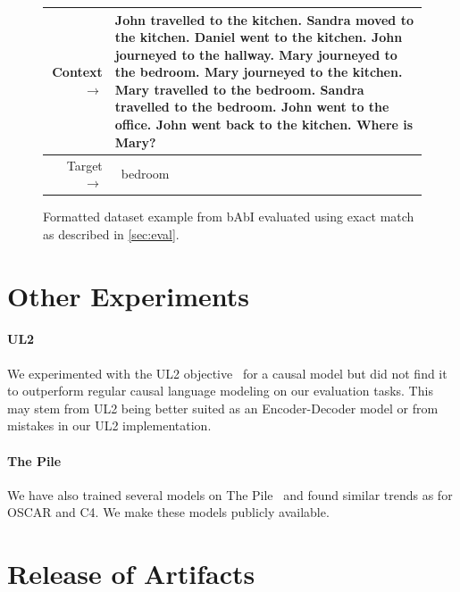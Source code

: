 \documentclass{article}
\begin{document}

\begin{figure}[ht] { \tt \footnotesize \begin{tabularx}{\linewidth}{r X} \toprule Context $\to$ & John travelled to the kitchen. Sandra moved to the kitchen. Daniel went to the kitchen. John journeyed to the hallway. Mary journeyed to the bedroom. Mary journeyed to the kitchen. Mary travelled to the bedroom. Sandra travelled to the bedroom. John went to the office. John went back to the kitchen. Where is Mary?\\
\midrule 
Target $\to$ & ~bedroom\\
\bottomrule \end{tabularx} }
\caption{Formatted dataset example from bAbI evaluated using exact match as described in \autoref{sec:eval}.}  
\label{eval:babi}  
\end{figure}


\clearpage

\section{Other Experiments}
\label{sec:other}
\paragraph{UL2} We experimented with the UL2 objective~\cite{tay2022unifying,tay2022transcending} for a causal model but did not find it to outperform regular causal language modeling on our evaluation tasks. This may stem from UL2 being better suited as an Encoder-Decoder model or from mistakes in our UL2 implementation.

\paragraph{The Pile} We have also trained several models on The Pile~\cite{gao2020pile} and found similar trends as for OSCAR and C4. We make these models publicly available.

\section{Release of Artifacts}
\label{sec:release}

\end{document}
